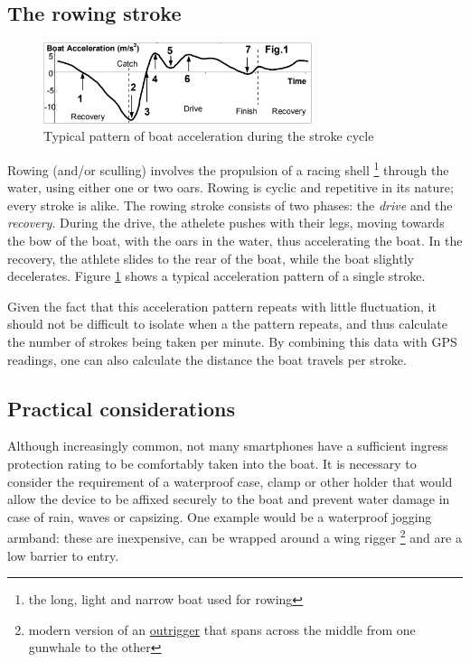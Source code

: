 \documentclass[11pt,twoside,a4paper]{report}
\begin{document}
\subsection{The rowing stroke}

\begin{figure}[ht]
    \centering
    \includegraphics[width=0.7\textwidth]{rowing-stroke}
    \caption{Typical pattern of boat acceleration during the stroke cycle \cite{dr_valery_kleshnev_analysis_2012}}
    \label{fig:rowing-stroke}
\end{figure}

Rowing (and/or sculling) involves the propulsion of a racing shell \footnote{the long, light and narrow boat used for rowing} through the water, using either one or two oars. 
Rowing is cyclic and repetitive in its nature; every stroke is alike. 
The rowing stroke consists of two phases: the \textit{drive} and the \textit{recovery}. 
During the drive, the athelete pushes with their legs, moving towards the bow of the boat, with the oars in the water, thus accelerating the boat.
In the recovery, the athlete slides to the rear of the boat, while the boat slightly decelerates.
Figure \ref{fig:rowing-stroke} shows a typical acceleration pattern of a single stroke.

Given the fact that this acceleration pattern repeats with little fluctuation, it should not be difficult to isolate when a the pattern repeats, and thus calculate the number of strokes being taken per minute. By combining this data with GPS readings, one can also calculate the distance the boat travels per stroke.

\subsection{Practical considerations}

Although increasingly common, not many smartphones have a sufficient ingress protection rating to be comfortably taken into the boat. 
It is necessary to consider the requirement of a waterproof case, clamp or other holder that would allow the device to be affixed securely to the boat and prevent water damage in case of rain, waves or capsizing. 
One example would be a waterproof jogging armband: these are inexpensive, can be wrapped around a wing rigger \footnote{modern version of an \href{https://en.wikipedia.org/wiki/Outrigger}{outrigger} that spans across the middle from one gunwhale to the other} and are a low barrier to entry.
\end{document}
